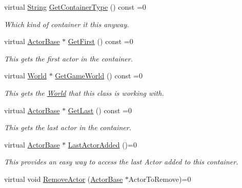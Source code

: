 \begin{DoxyCompactItemize}
virtual \hyperlink{namespacephys_aa03900411993de7fbfec4789bc1d392e}{String} \hyperlink{classphys_1_1ActorContainerBase_a0ed43bc828aaee8ee33152970c3cc16d}{GetContainerType} () const =0
\begin{DoxyCompactList}\small\item\em Which kind of container it this anyway. \item\end{DoxyCompactList}\item 
virtual \hyperlink{classphys_1_1ActorBase}{ActorBase} $\ast$ \hyperlink{classphys_1_1ActorContainerBase_ae703482d84a9c6726e28a8f26418b161}{GetFirst} () const =0
\begin{DoxyCompactList}\small\item\em This gets the first actor in the container. \item\end{DoxyCompactList}\item 
virtual \hyperlink{classphys_1_1World}{World} $\ast$ \hyperlink{classphys_1_1ActorContainerBase_a479e6c7434f2611b0cfe6ca1fd4ebdd1}{GetGameWorld} () const =0
\begin{DoxyCompactList}\small\item\em This gets the \hyperlink{classphys_1_1World}{World} that this class is working with. \item\end{DoxyCompactList}\item 
virtual \hyperlink{classphys_1_1ActorBase}{ActorBase} $\ast$ \hyperlink{classphys_1_1ActorContainerBase_a8efeffd5ae22085fe01af791b3ea559e}{GetLast} () const =0
\begin{DoxyCompactList}\small\item\em This gets the last actor in the container. \item\end{DoxyCompactList}\item 
virtual \hyperlink{classphys_1_1ActorBase}{ActorBase} $\ast$ \hyperlink{classphys_1_1ActorContainerBase_a6ccc6d058bcbbe0b9a638e28fb136477}{LastActorAdded} ()=0
\begin{DoxyCompactList}\small\item\em This provides an easy way to access the last Actor added to this container. \item\end{DoxyCompactList}\item 
virtual void \hyperlink{classphys_1_1ActorContainerBase_a523072e42f6b581d044432f84a84ede4}{RemoveActor} (\hyperlink{classphys_1_1ActorBase}{ActorBase} $\ast$ActorToRemove)=0

\end{DoxyCompactItemize}
